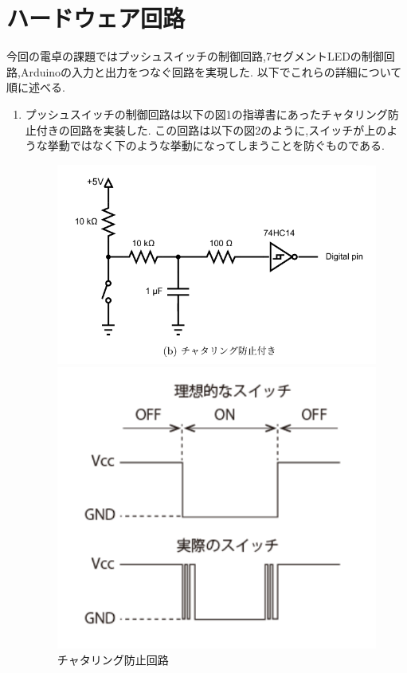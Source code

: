 \documentclass[dvipdfmx]{jarticle}
\begin{document}
\section{ハードウェア回路}
今回の電卓の課題ではプッシュスイッチの制御回路,7セグメントLEDの制御回路,Arduinoの入力と出力をつなぐ回路を実現した.
以下でこれらの詳細について順に述べる.
\begin{enumerate}
    \item プッシュスイッチの制御回路は以下の図1の指導書にあったチャタリング防止付きの回路を実装した.\cite{1}
    この回路は以下の図2のように,スイッチが上のような挙動ではなく下のような挙動になってしまうことを防ぐものである.\cite{2}
    
    \begin{figure}[h]
        \begin{minipage}[b]{0.45\linewidth}
          \centering
          \includegraphics[keepaspectratio, scale=0.4]{tyataringu.png}
          \caption{チャタリング防止回路}
        \end{minipage}
        \begin{minipage}[b]{0.45\linewidth}
          \centering
          \includegraphics[keepaspectratio, scale=0.4]{switch.png}

\end{minipage}
\end{figure}
\end{enumerate}
\end{document}
